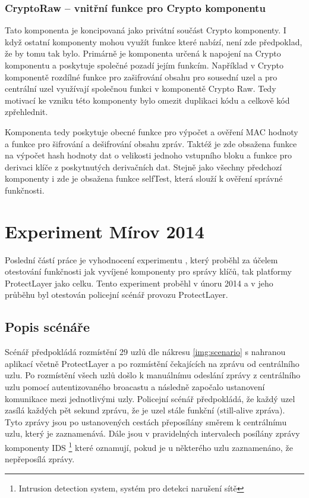 \documentclass[11pt,final,twoside]{fithesis2}
\begin{document}
\subsection{CryptoRaw -- vnitřní funkce pro Crypto komponentu} \label{sub:rawcrypto}

Tato komponenta je koncipovaná jako privátní součást Crypto komponenty. I když ostatní komponenty mohou využít funkce které 
nabízí, není zde předpoklad, že by tomu tak bylo. Primárně je komponenta určená k napojení na Crypto komponentu a poskytuje 
společné pozadí jejím funkcím. Například v Crypto komponentě rozdílné funkce pro zašifrování obsahu pro sousední uzel a pro 
centrální uzel využívají společnou funkci v komponentě Crypto Raw. Tedy motivací ke vzniku této komponenty bylo omezit duplikaci kódu 
a celkově kód zpřehlednit. 

Komponenta tedy poskytuje obecné funkce pro výpočet a ověření MAC hodnoty a funkce pro šifrování a dešifrování obsahu zpráv. 
Taktéž je zde obsažena funkce na výpočet hash hodnoty dat o velikosti jednoho vstupního bloku a funkce pro derivaci klíče z 
poskytnutých derivačních dat. Stejně jako všechny předchozí komponenty i zde je obsažena funkce selfTest, která slouží k ověření
správné funkčnosti. 

\chapter{Experiment Mírov 2014}
Poslední částí práce je vyhodnocení experimentu \cite{Svenda2014}, který proběhl za účelem otestování funkčnosti jak vyvíjené komponenty 
pro správy klíčů, tak platformy ProtectLayer jako celku. Tento experiment proběhl v únoru 2014 a v jeho průběhu byl otestován
policejní scénář provozu ProtectLayer. 

\section{Popis scénáře}
Scénář předpokládá rozmístění 29 uzlů dle nákresu \ref{img:scenario} s nahranou aplikací včetně ProtectLayer a po rozmístění čekajících 
na zprávu od centrálního uzlu. Po rozmístění všech uzlů došlo k manuálnímu odeslání zprávy z centrálního uzlu pomocí autentizovaného 
broacastu a následně započalo ustanovení komunikace mezi jednotlivými uzly. Policejní scénář předpokládá, že každý uzel zasílá každých 
pět sekund zprávu, že je uzel stále funkční (still-alive zpráva). Tyto zprávy jsou po ustanovených cestách přeposílány směrem k 
centrálnímu uzlu, který je zaznamenává. Dále jsou v pravidelných intervalech posílány zprávy komponenty IDS \footnote{Intrusion detection 
system, systém pro detekci narušení sítě} které oznamují, pokud je u některého uzlu zaznamenáno, že nepřeposílá zprávy. 
\end{document}
